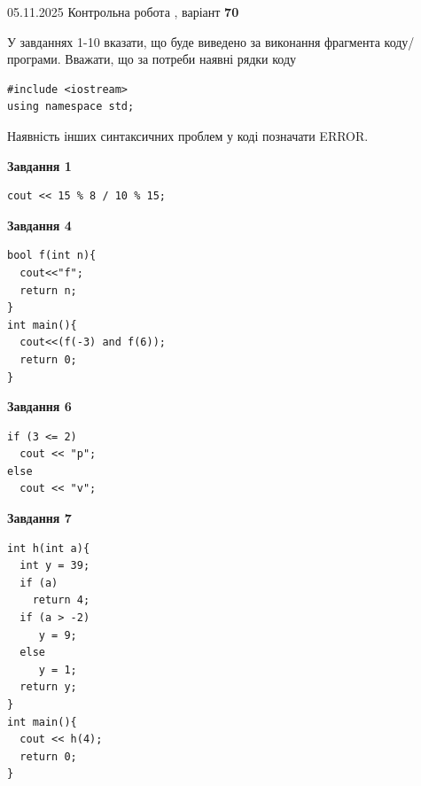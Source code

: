 \documentclass[12pt, ukrainian]{article}
\begin{document}
{\Large{05.11.2025 Контрольна робота , варіант  \No \textbf { 70 }\par}}
{
\begin {large}
У завданнях 1-10 вказати, що буде виведено за виконання фрагмента коду/про\-гра\-ми.
Вважати, що за потреби наявні рядки коду
\begin{verbatim}
#include <iostream>
using namespace std;
\end{verbatim}
Наявність інших синтаксичних проблем у коді позначати ERROR.

\begin{minipage}[t]{7.0cm}

\begin{center}
\textbf{Завдання 1}
\end{center}
\vspace{-8mm}

\begin{verbatim}
cout << 15 % 8 / 10 % 15;
\end{verbatim}



\begin{center}
\textbf{Завдання 4}
\end{center}
\vspace{-8mm}

\begin{verbatim}
bool f(int n){
  cout<<"f";
  return n;
}
int main(){
  cout<<(f(-3) and f(6));
  return 0;
}
\end{verbatim}



\begin{center}
\textbf{Завдання 6}
\end{center}
\vspace{-8mm}

\begin{verbatim}
if (3 <= 2)
  cout << "p";
else
  cout << "v";
\end{verbatim}



\begin{center}
\textbf{Завдання 7}
\end{center}
\vspace{-8mm}

\begin{verbatim}
int h(int a){
  int y = 39;
  if (a)
    return 4;
  if (a > -2)
     y = 9;
  else
     y = 1;
  return y;
}
int main(){
  cout << h(4);
  return 0;
}
\end{verbatim}


\end{minipage}
\end{large}}
\end{document}
